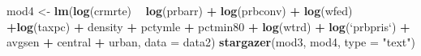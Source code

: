 \documentclass[]{article}
\newenvironment{Shaded}{\begin{snugshade}}{\end{snugshade}}
\newcommand{\DataTypeTok}[1]{\textcolor[rgb]{0.13,0.29,0.53}{#1}}
\newcommand{\KeywordTok}[1]{\textcolor[rgb]{0.13,0.29,0.53}{\textbf{#1}}}
\newcommand{\NormalTok}[1]{#1}
\newcommand{\OperatorTok}[1]{\textcolor[rgb]{0.81,0.36,0.00}{\textbf{#1}}}
\newcommand{\StringTok}[1]{\textcolor[rgb]{0.31,0.60,0.02}{#1}}
\begin{document}
\begin{Shaded}
\begin{Highlighting}[]
\NormalTok{mod4 <-}\StringTok{ }\KeywordTok{lm}\NormalTok{(}\KeywordTok{log}\NormalTok{(crmrte) }\OperatorTok{~}\StringTok{ }\KeywordTok{log}\NormalTok{(prbarr) }\OperatorTok{+}\StringTok{ }\KeywordTok{log}\NormalTok{(prbconv) }\OperatorTok{+}\StringTok{ }\KeywordTok{log}\NormalTok{(wfed) }\OperatorTok{+}\KeywordTok{log}\NormalTok{(taxpc) }\OperatorTok{+}\StringTok{ }\NormalTok{density }\OperatorTok{+}\StringTok{ }\NormalTok{pctymle }\OperatorTok{+}\StringTok{ }\NormalTok{pctmin80 }\OperatorTok{+}\StringTok{ }\KeywordTok{log}\NormalTok{(wtrd) }\OperatorTok{+}\StringTok{  }\KeywordTok{log}\NormalTok{(}\StringTok{`}\DataTypeTok{prbpris}\StringTok{`}\NormalTok{) }\OperatorTok{+}\StringTok{ }\NormalTok{avgsen }\OperatorTok{+}\StringTok{ }\NormalTok{central }\OperatorTok{+}\StringTok{ }\NormalTok{urban, }\DataTypeTok{data =}\NormalTok{ data2)}
\KeywordTok{stargazer}\NormalTok{(mod3, mod4, }\DataTypeTok{type =} \StringTok{"text"}\NormalTok{)}
\end{Highlighting}
\end{Shaded}
\end{document}
